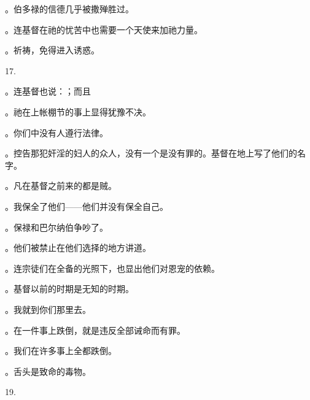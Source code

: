 。伯多禄的信德几乎被撒殚胜过。\par

。连基督在祂的忧苦中也需要一个天使来加祂力量。\par

。祈祷，免得进入诱惑。\par

17.\par

。连基督也说：；而且\par

。祂在上帐棚节的事上显得犹豫不决。\par

。你们中没有人遵行法律。\par

。控告那犯奸淫的妇人的众人，没有一个是没有罪的。基督在地上写了他们的名字。\par

。凡在基督之前来的都是贼。\par

。我保全了他们——他们并没有保全自己。\par

。保禄和巴尔纳伯争吵了。\par

。他们被禁止在他们选择的地方讲道。\par

。连宗徒们在全备的光照下，也显出他们对恩宠的依赖。\par

。基督以前的时期是无知的时期。\par

。我就到你们那里去。\par

。在一件事上跌倒，就是违反全部诫命而有罪。\par

。我们在许多事上全都跌倒。\par

。舌头是致命的毒物。\par

19.\par

